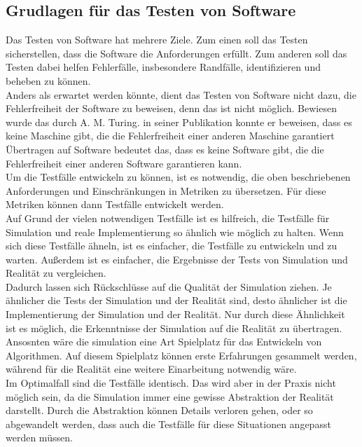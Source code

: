 \subsection{Grudlagen für das Testen von Software}
Das Testen von Software hat mehrere Ziele. Zum einen soll das Testen sicherstellen, dass die Software die Anforderungen erfüllt. 
Zum anderen soll das Testen dabei helfen Fehlerfälle, insbesondere Randfälle, identifizieren und beheben zu können. \\
Anders als erwartet werden könnte, dient das Testen von Software nicht dazu, die Fehlerfreiheit der Software zu beweisen, denn das ist nicht möglich. Bewiesen wurde das durch A. M. Turing. in seiner Publikation konnte er beweisen, dass es keine Maschine gibt, die die Fehlerfreiheit einer anderen Maschine garantiert \cite[S. 259ff]{maria1997introduction} \\
Übertragen auf Software bedeutet das, dass es keine Software gibt, die die Fehlerfreiheit einer anderen Software garantieren kann. \\
Um die Testfälle entwickeln zu können, ist es notwendig, die oben beschriebenen Anforderungen und Einschränkungen in Metriken zu übersetzen. Für diese Metriken können dann Testfälle entwickelt werden. \\
Auf Grund der vielen notwendigen Testfälle ist es hilfreich, die Testfälle für Simulation und reale Implementierung so ähnlich wie möglich zu halten. 
Wenn sich diese Testfälle ähneln, ist es einfacher, die Testfälle zu entwickeln und zu warten. Außerdem ist es einfacher, die Ergebnisse der Tests von Simulation und Realität zu vergleichen.\\
Dadurch lassen sich Rückschlüsse auf die Qualität der Simulation ziehen. Je ähnlicher die Tests der Simulation und der Realität sind, desto ähnlicher ist die Implementierung der Simulation und der Realität. 
Nur durch diese Ähnlichkeit ist es möglich, die Erkenntnisse der Simulation auf die Realität zu übertragen. Ansosnten wäre die simulation eine Art Spielplatz für das Entwickeln von Algorithmen. Auf diesem Spielplatz können erste Erfahrungen gesammelt werden, während für die Realität eine weitere Einarbeitung notwendig
wäre. \\
Im Optimalfall sind die Testfälle identisch. Das wird aber in der Praxis nicht möglich sein, da die Simulation immer eine gewisse Abstraktion der Realität darstellt. Durch die Abstraktion können Details verloren gehen, oder so abgewandelt werden, dass auch die Testfälle für diese Situationen angepasst werden müssen.



